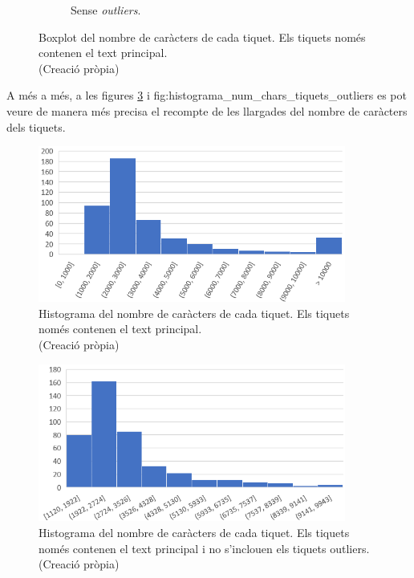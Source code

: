 \begin{figure}[H]
\begin{subfigure}{.5\textwidth}
      \caption{Sense \textit{outliers}.}
      \label{fig:boxplot_num_chars_tiquets_outliers}
    \end{subfigure}
    \caption[Boxplot dels caràcters del text principal de cada tiquet]{Boxplot del nombre de caràcters de cada tiquet. Els tiquets només contenen el text principal. \\ (Creació pròpia)}
    \label{fig:boxplot_num_chars_tiquets_dos}
\end{figure}

A més a més, a les figures \ref{fig:histograma_num_chars_tiquets} i {fig:histograma_num_chars_tiquets_outliers} es pot veure de manera més precisa el recompte de les llargades del nombre de caràcters dels tiquets.

\begin{figure}[H]
    \centering
    \includegraphics[width=0.9\textwidth]{histograma_num_chars_tiquets.png}
    \caption[Histograma dels caràcters del text principal de cada tiquet]{Histograma del nombre de caràcters de cada tiquet. Els tiquets només contenen el text principal. \\ (Creació pròpia)}
    \label{fig:histograma_num_chars_tiquets}
\end{figure}


\begin{figure}[H]
    \centering
    \includegraphics[width=0.9\textwidth]{histograma_num_chars_tiquets_outliers.png}
    \caption[Histograma dels caràcters del text principal de cada tiquet sense outliers]{Histograma del nombre de caràcters de cada tiquet. Els tiquets només contenen el text principal i no s'inclouen els tiquets outliers. \\ (Creació pròpia)}
    \label{fig:histograma_num_chars_tiquets_outliers}
\end{figure}

